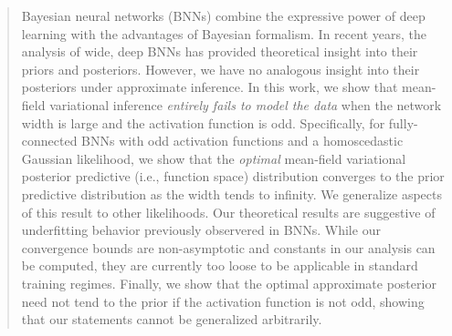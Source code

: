 \documentclass[twoside]{article}
\theoremstyle{theoremstyle}
\begin{document}
\begin{abstract}
Bayesian neural networks (BNNs) combine the expressive power of deep learning with the advantages of Bayesian formalism. In recent years, the analysis of wide, deep BNNs has provided theoretical insight into their priors and posteriors. However, we have no analogous insight into their posteriors under approximate inference. In this work, we show that mean-field variational inference \emph{entirely fails to model the data} when the network width is large and the activation function is odd. Specifically, for fully-connected BNNs with odd activation functions and a homoscedastic Gaussian likelihood, we show that the \emph{optimal} mean-field variational posterior predictive (i.e., function space) distribution converges to the prior predictive distribution as the width tends to infinity. We generalize aspects of this result to other likelihoods. 
Our theoretical results are suggestive of underfitting behavior previously observered in BNNs. While our convergence  bounds are non-asymptotic and constants in our analysis can be computed, they are currently too loose to be applicable in standard training regimes. Finally, we show that the optimal approximate posterior need not tend to the prior if the activation function is not odd, showing that our statements cannot be generalized arbitrarily.
\end{abstract}
\end{document}
